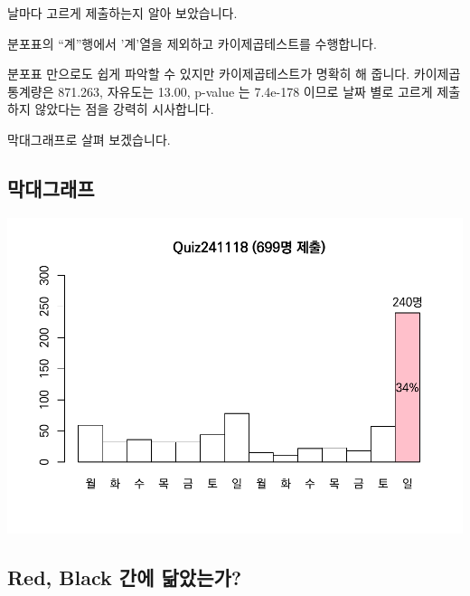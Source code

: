 \documentclass[
]{book}
\begin{document}
날마다 고르게 제출하는지 알아 보았습니다.

분포표의 ``계''행에서 '계'열을 제외하고 카이제곱테스트를 수행합니다.

분포표 만으로도 쉽게 파악할 수 있지만 카이제곱테스트가 명확히 해 줍니다. 카이제곱 통계량은 871.263, 자유도는 13.00, p-value 는 7.4e-178 이므로 날짜 별로 고르게 제출하지 않았다는 점을 강력히 시사합니다.

막대그래프로 살펴 보겠습니다.

\subsection{막대그래프}\label{uxb9c9uxb300uxadf8uxb798uxd504-13}

\includegraphics{Quiz_report_2025_files/figure-latex/unnamed-chunk-379-1.pdf}

\subsection{Red, Black 간에 닮았는가?}\label{red-black-uxac04uxc5d0-uxb2eeuxc558uxb294uxac00-11}
\end{document}
